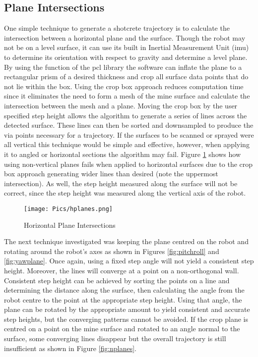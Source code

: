 \subsection{Plane Intersections}

One simple technique to generate a shotcrete trajectory is to calculate the intersection between a horizontal plane and the surface. Though the robot may not be on a level surface, it can use its built in Inertial Measurement Unit (\acrshort{imu}) to determine its orientation with respect to gravity and determine a level plane. By using the  function of the \acrshort{pcl} library the software can inflate the plane to a rectangular prism of a desired thickness and crop all surface data points that do not lie within the box. Using the crop box approach reduces computation time since it eliminates the need to form a mesh of the mine surface and calculate the intersection between the mesh and a plane. Moving the crop box by the user specified step height allows the algorithm to generate a series of lines across the detected surface. These lines can then be sorted and downsampled to produce the via points necessary for a trajectory. If the surfaces to be scanned or sprayed were all vertical this technique would be simple and effective, however, when applying it to angled or horizontal sections the algorithm may fail. Figure \ref{fig:hplanes} shows how using non-vertical planes fails when applied to horizontal surfaces due to the crop box approach generating wider lines than desired (note the uppermost intersection). As well, the step height measured along the surface will not be correct, since the step height was measured along the vertical axis of the robot.\\

\begin{figure}[h]
    \centering
    \texttt{[image: Pics/hplanes.png]}
    \caption{Horizontal Plane Intersections}
    \label{fig:hplanes}
\end{figure}
The next technique investigated was keeping the plane centred on the robot and rotating around the robot's axes as shown in Figures \ref{fig:pitchroll} and \ref{fig:yawplane}. Once again, using a fixed step angle will not yield a consistent step height. Moreover, the lines will converge at a point on a non-orthogonal wall. Consistent step height can be achieved by sorting the points on a line and determining the distance along the surface, then calculating the angle from the robot centre to the point at the appropriate step height. Using that angle, the plane can be rotated by the appropriate amount to yield consistent and accurate step heights, but the converging patterns cannot be avoided. If the crop plane is centred on a point on the mine surface and rotated to an angle normal to the surface, some converging lines disappear but the overall trajectory is still insufficient as shown in Figure \ref{fig:nplanes}. \\

